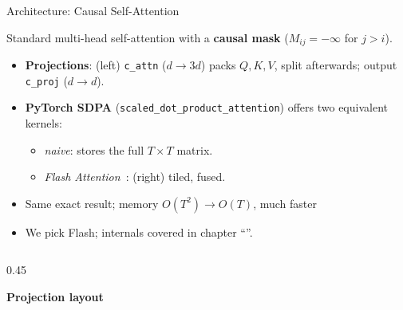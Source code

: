 \begin{frame}{Architecture: Causal Self-Attention}

  Standard multi-head self-attention with a \textbf{causal mask} ($M_{ij}{=}{-}\infty$ for $j{>}i$).
  \begin{itemize}
    \itemsep0.1em
    \item \textbf{Projections}: (left) \texttt{c\_attn} ($d \to 3d$) packs $Q, K, V$, split afterwards; output \texttt{c\_proj} ($d \to d$).
    \item \textbf{PyTorch SDPA} (\texttt{scaled\_dot\_product\_attention}) offers two equivalent kernels:
      \begin{itemize}
        \item \emph{naive}: stores the full $T{\times}T$ matrix.
        \item \emph{Flash Attention}~\cite{dao2022flashattention}: (right) tiled, fused.
      \end{itemize}
    \item Same exact result; memory $O(T^2){\to}O(T)$, much faster
    \item We pick Flash; internals covered in chapter ``''.
  \end{itemize}

  \vspace{0.2em}
  \begin{columns}
    \begin{column}{0.45\textwidth}
      \begin{center}
      \textbf{\small Projection layout}\\[0.2em]
\end{center}
\end{column}
\end{columns}
\end{frame}
